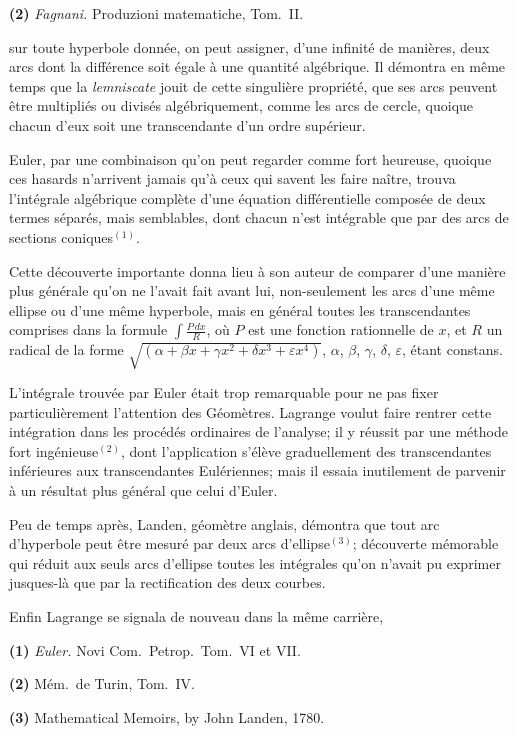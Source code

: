 \documentclass{article}
\begin{document}
\textbf{(2)} \emph{Fagnani.} Produzioni matematiche, Tom.\ II.

sur toute hyperbole donnée, on peut assigner, d'une infinité de manières, deux arcs dont la différence soit égale à une quantité algébrique. Il démontra en même temps que la \emph{lemniscate} jouit de cette singulière propriété, que ses arcs peuvent être multipliés ou divisés algébriquement, comme les arcs de cercle, quoique chacun d'eux soit une transcendante d'un ordre supérieur.

Euler, par une combinaison qu'on peut regarder comme fort heureuse, quoique ces hasards n'arrivent jamais qu'à ceux qui savent les faire naître, trouva l'intégrale algébrique complète d'une équation différentielle composée de deux termes séparés, mais semblables, dont chacun n'est intégrable que par des arcs de sections coniques${}^{(1)}$.

Cette découverte importante donna lieu à son auteur de comparer d'une manière plus générale qu'on ne l'avait fait avant lui, non-seulement les arcs d'une même ellipse ou d'une même hyperbole, mais en général toutes les transcendantes comprises dans la formule $\displaystyle\int\frac{P\,dx}{R}$, où $P$ est une fonction rationnelle de $x$, et $R$ un radical de la forme $\sqrt{(\alpha+\beta x+\gamma x^{2}+\delta x^{3}+\varepsilon x^{4})}$, $\alpha$, $\beta$, $\gamma$, $\delta$, $\varepsilon$, étant constans.

L'intégrale trouvée par Euler était trop remarquable pour ne pas fixer particulièrement l'attention des Géomètres. Lagrange voulut faire rentrer cette intégration dans les procédés ordinaires de l'analyse; il y réussit par une méthode fort ingénieuse${}^{(2)}$, dont l'application s'élève graduellement des transcendantes inférieures aux transcendantes Eulériennes; mais il essaia inutilement de parvenir à un résultat plus général que celui d'Euler.

Peu de temps après, Landen, géomètre anglais, démontra que tout arc d'hyperbole peut être mesuré par deux arcs d'ellipse${}^{(3)}$; découverte mémorable qui réduit aux seuls arcs d'ellipse toutes les intégrales qu'on n'avait pu exprimer jusques-là que par la rectification des deux courbes.

Enfin Lagrange se signala de nouveau dans la même carrière,

\textbf{(1)} \emph{Euler.} Novi Com.\ Petrop.\ Tom.\ VI et VII.

\textbf{(2)} Mém.\ de Turin, Tom.\ IV.

\textbf{(3)} Mathematical Memoirs, by John Landen, 1780.
\end{document}

